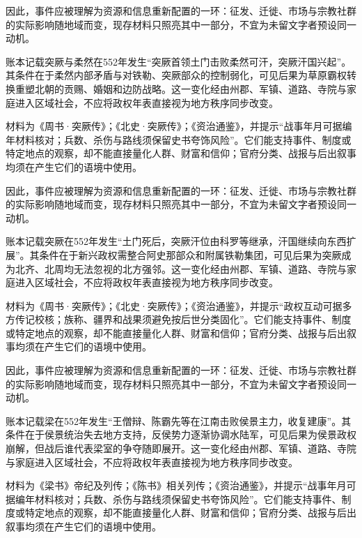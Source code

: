 因此，事件应被理解为资源和信息重新配置的一环：征发、迁徙、市场与宗教社群的实际影响随地域而变，现存材料只照亮其中一部分，不宜为未留文字者预设同一动机。

账本记载突厥与柔然在552年发生“突厥首领土门击败柔然可汗，突厥汗国兴起”。其条件在于柔然内部矛盾与对铁勒、突厥部众的控制弱化，可见后果为草原霸权转换重塑北朝的贡赐、婚姻和边防战略。这一变化经由州郡、军镇、道路、寺院与家庭进入区域社会，不应将政权年表直接视为地方秩序同步改变。

材料为《周书·突厥传》；《北史·突厥传》；《资治通鉴》，并提示“战事年月可据编年材料核对；兵数、杀伤与路线须保留史书夸饰风险”。它们能支持事件、制度或特定地点的观察，却不能直接量化人群、财富和信仰；官府分类、战报与后出叙事均须在产生它们的语境中使用。

因此，事件应被理解为资源和信息重新配置的一环：征发、迁徙、市场与宗教社群的实际影响随地域而变，现存材料只照亮其中一部分，不宜为未留文字者预设同一动机。

账本记载突厥在552年发生“土门死后，突厥汗位由科罗等继承，汗国继续向东西扩展”。其条件在于新兴政权需整合阿史那部众和附属铁勒集团，可见后果为突厥成为北齐、北周均无法忽视的北方强邻。这一变化经由州郡、军镇、道路、寺院与家庭进入区域社会，不应将政权年表直接视为地方秩序同步改变。

材料为《周书·突厥传》；《北史·突厥传》；《资治通鉴》，并提示“政权互动可据多方传记校核；族称、疆界和战果须避免按后世分类固化”。它们能支持事件、制度或特定地点的观察，却不能直接量化人群、财富和信仰；官府分类、战报与后出叙事均须在产生它们的语境中使用。

因此，事件应被理解为资源和信息重新配置的一环：征发、迁徙、市场与宗教社群的实际影响随地域而变，现存材料只照亮其中一部分，不宜为未留文字者预设同一动机。

账本记载梁在552年发生“王僧辩、陈霸先等在江南击败侯景主力，收复建康”。其条件在于侯景统治失去地方支持，反侯势力逐渐协调水陆军，可见后果为侯景政权崩解，但战后谁代表梁室的争夺随即展开。这一变化经由州郡、军镇、道路、寺院与家庭进入区域社会，不应将政权年表直接视为地方秩序同步改变。

材料为《梁书》帝纪及列传；《陈书》相关列传；《资治通鉴》，并提示“战事年月可据编年材料核对；兵数、杀伤与路线须保留史书夸饰风险”。它们能支持事件、制度或特定地点的观察，却不能直接量化人群、财富和信仰；官府分类、战报与后出叙事均须在产生它们的语境中使用。

